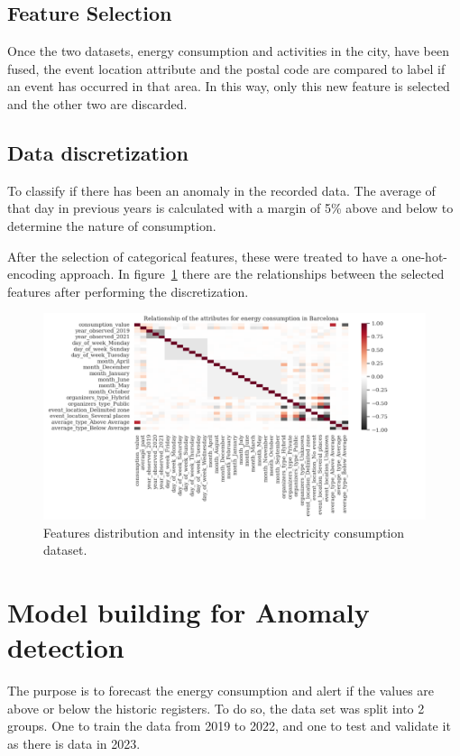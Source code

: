 \documentclass[a4paper,12pt,twoside]{ThesisStyle}
\begin{document}
\subsection{Feature Selection}

Once the two datasets, energy consumption and activities in the city, have been fused, the event location attribute and the postal code are compared to label if an event has occurred in that area. In this way, only this new feature is selected and the other two are discarded.

\subsection{Data discretization}

To classify if there has been an anomaly in the recorded data. The average of that day in previous years is calculated with a margin of 5\% above and below to determine the nature of  consumption.

After the selection of categorical features, these were treated to have a one-hot-encoding approach. In figure~\ref{fig:energy_bcn_heatmap} there are the relationships between the selected features after performing the discretization.

\begin{figure}[hbt]
\centering
\includegraphics[width=13 cm]{imatges/energy_bcn_heatmap.png}
\caption{\label{fig:energy_bcn_heatmap} Features distribution and intensity in the electricity consumption dataset.}
\end{figure}

\section{Model building for Anomaly detection}

The purpose is to forecast the energy consumption and alert if the values are above or below the historic registers.
To do so, the data set was split into 2 groups. One to train the data from 2019 to 2022, and one to test and validate it as there is data in 2023.
\end{document}
